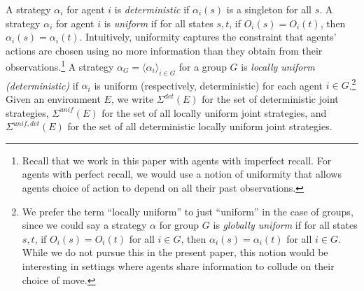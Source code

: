 \documentclass[a4wide]{article}
\theoremstyle{examplesty}
\newcommand{\Env}{E}
\newcommand{\detstrat}{\mathit{det}}
\newcommand{\sgy}{\alpha}
\newcommand{\unif}{\mathit{unif}}
\newcommand{\Strat}{\Sigma}
\begin{document}
A strategy $\sgy_i$ for agent $i$ is {\em deterministic} if $\sgy_i(s)$ is a singleton
for all $s$. 
 A strategy $\sgy_i$ for agent $i$ is {\em uniform} if for all states $s,t$, if $O_i(s) = O_i(t)$, then 
 $\sgy_i(s)  = \sgy_i(t)$. 
Intuitively, uniformity captures the constraint that agents' actions are 
 chosen using no more information than they obtain from their observations.\footnote{Recall that we work in this paper with agents with imperfect recall. For agents with 
 perfect recall, we would use a notion of uniformity that allows agents choice of action to 
 depend on all their past observations.} 
A strategy $\sgy_G = \langle \sgy_i\rangle_{i \in G}$ for a group $G$ 
 is {\em locally uniform (deterministic)} if $\sgy_i$ is uniform (respectively, deterministic) for each agent $i\in G$.\footnote{We prefer the term ``locally uniform'' to just ``uniform'' in the case of groups, 
 since we could say a strategy $\sgy$ for group $G$ is {\em globally uniform} if for all states $s,t$, if $O_i(s) = O_i(t)$ for all $i\in G$, then 
$\sgy_i(s)  = \sgy_i(t)$ for all $i\in G$.  
While we do not pursue this in the present paper, this notion would be interesting in 
settings where agents share information to collude on their choice of move.} 
Given an environment $\Env$,   we write
 $\Strat^\detstrat(\Env)$ for the set of deterministic 
joint 
 strategies, 
 $\Strat^\unif(\Env)$ for the set of all 
 locally uniform joint strategies, and  $\Strat^{\unif, \detstrat}(\Env)$ for the set of all deterministic 
 locally uniform joint strategies.   
\end{document}
